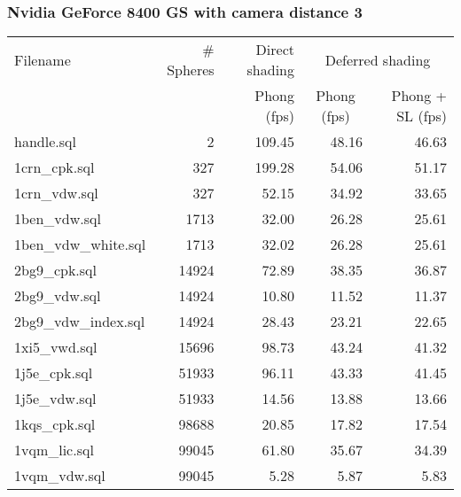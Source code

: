 \subsubsection*{Nvidia GeForce 8400 GS with camera distance 3}
\begin{tabular}{|l|r|r|r|r|}
\hline
Filename & \# Spheres & Direct shading & \multicolumn{2}{|c|}{Deferred shading} \\
         &            & Phong (fps)    & \multicolumn{1}{|c}{Phong (fps)} & Phong + SL (fps) \\  
\hline
\hline
handle.sql & 2 & 109.45 & 48.16 & 46.63 \\
\hline
1crn\_cpk.sql & 327 & 199.28 & 54.06 & 51.17 \\
\hline
1crn\_vdw.sql & 327 & 52.15 & 34.92 & 33.65 \\
\hline
1ben\_vdw.sql & 1713 & 32.00 & 26.28 & 25.61 \\
\hline
1ben\_vdw\_white.sql & 1713 & 32.02 & 26.28 & 25.61 \\
\hline
2bg9\_cpk.sql & 14924 & 72.89 & 38.35 & 36.87 \\
\hline
2bg9\_vdw.sql & 14924 & 10.80 & 11.52 & 11.37 \\
\hline
2bg9\_vdw\_index.sql & 14924 & 28.43 & 23.21 & 22.65 \\
\hline
1xi5\_vwd.sql & 15696 & 98.73 & 43.24 & 41.32 \\
\hline
1j5e\_cpk.sql & 51933 & 96.11 & 43.33 & 41.45 \\
\hline
1j5e\_vdw.sql & 51933 & 14.56 & 13.88 & 13.66 \\
\hline
1kqs\_cpk.sql & 98688 & 20.85 & 17.82 & 17.54 \\
\hline
1vqm\_lic.sql & 99045 & 61.80 & 35.67 & 34.39 \\
\hline
1vqm\_vdw.sql & 99045 & 5.28 & 5.87 & 5.83 \\
\hline
\end{tabular}
